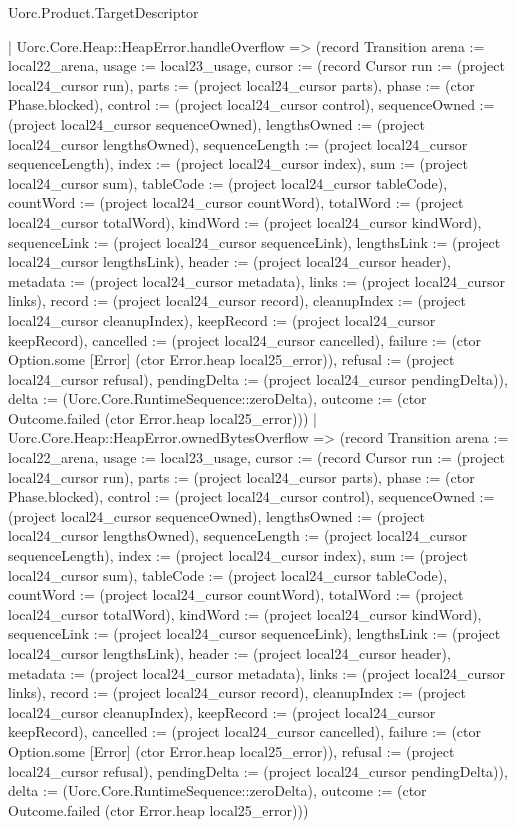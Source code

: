 \begin{lexlean}{Uorc.Product.TargetDescriptor}
\begin{semanticmodule}
{    | Uorc.Core.Heap::HeapError.handleOverflow => (record Transition {arena := local22_arena, usage := local23_usage, cursor := (record Cursor {run := (project local24_cursor run), parts := (project local24_cursor parts), phase := (ctor Phase.blocked), control := (project local24_cursor control), sequenceOwned := (project local24_cursor sequenceOwned), lengthsOwned := (project local24_cursor lengthsOwned), sequenceLength := (project local24_cursor sequenceLength), index := (project local24_cursor index), sum := (project local24_cursor sum), tableCode := (project local24_cursor tableCode), countWord := (project local24_cursor countWord), totalWord := (project local24_cursor totalWord), kindWord := (project local24_cursor kindWord), sequenceLink := (project local24_cursor sequenceLink), lengthsLink := (project local24_cursor lengthsLink), header := (project local24_cursor header), metadata := (project local24_cursor metadata), links := (project local24_cursor links), record := (project local24_cursor record), cleanupIndex := (project local24_cursor cleanupIndex), keepRecord := (project local24_cursor keepRecord), cancelled := (project local24_cursor cancelled), failure := (ctor Option.some [Error] (ctor Error.heap local25_error)), refusal := (project local24_cursor refusal), pendingDelta := (project local24_cursor pendingDelta)}), delta := (Uorc.Core.RuntimeSequence::zeroDelta), outcome := (ctor Outcome.failed (ctor Error.heap local25_error))})
    | Uorc.Core.Heap::HeapError.ownedBytesOverflow => (record Transition {arena := local22_arena, usage := local23_usage, cursor := (record Cursor {run := (project local24_cursor run), parts := (project local24_cursor parts), phase := (ctor Phase.blocked), control := (project local24_cursor control), sequenceOwned := (project local24_cursor sequenceOwned), lengthsOwned := (project local24_cursor lengthsOwned), sequenceLength := (project local24_cursor sequenceLength), index := (project local24_cursor index), sum := (project local24_cursor sum), tableCode := (project local24_cursor tableCode), countWord := (project local24_cursor countWord), totalWord := (project local24_cursor totalWord), kindWord := (project local24_cursor kindWord), sequenceLink := (project local24_cursor sequenceLink), lengthsLink := (project local24_cursor lengthsLink), header := (project local24_cursor header), metadata := (project local24_cursor metadata), links := (project local24_cursor links), record := (project local24_cursor record), cleanupIndex := (project local24_cursor cleanupIndex), keepRecord := (project local24_cursor keepRecord), cancelled := (project local24_cursor cancelled), failure := (ctor Option.some [Error] (ctor Error.heap local25_error)), refusal := (project local24_cursor refusal), pendingDelta := (project local24_cursor pendingDelta)}), delta := (Uorc.Core.RuntimeSequence::zeroDelta), outcome := (ctor Outcome.failed (ctor Error.heap local25_error))})
}
\end{semanticmodule}
\end{lexlean}
